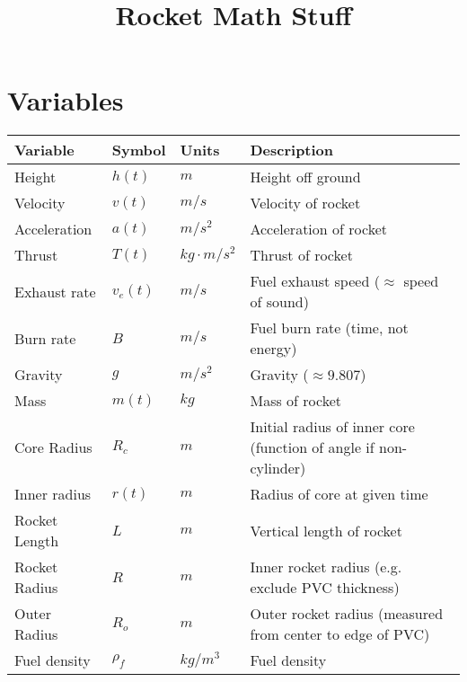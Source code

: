 \documentclass[12pt,a4paper]{article}
\title{Rocket Math Stuff}
\date{}
\begin{document}
\maketitle


\section{Variables}


\begin{tabular}{l | l | l | l}
    \textbf{Variable} & \textbf{Symbol} & \textbf{Units} & \textbf{Description} \\
    \hline
    Height             & $h(t)$      & $m$                   & Height off ground \\
    Velocity           & $v(t)$      & $m/s$                 & Velocity of rocket \\
    Acceleration       & $a(t)$      & $m/s^2$               & Acceleration of rocket \\
    Thrust             & $T(t)$      & $kg\cdot m/s^2$       & Thrust of rocket \\
    Exhaust rate       & $v_e(t)$    & $m/s$                 & Fuel exhaust speed ($\approx $ speed of sound) \\
    Burn rate          & $B$         & $m/s$                 & Fuel burn rate (time, not energy) \\
    Gravity            & $g$         & $m/s^2$               & Gravity ($\approx 9.807$) \\
    Mass               & $m(t)$      & $kg$                  & Mass of rocket \\
    Core Radius        & $R_c$       & $m$                   & Initial radius of inner core (function of angle if non-cylinder) \\
    Inner radius       & $r(t)$      & $m$                   & Radius of core at given time \\
    Rocket Length      & $L$         & $m$                   & Vertical length of rocket \\
    Rocket Radius      & $R$         & $m$                   & Inner rocket radius (e.g. exclude PVC thickness) \\
    Outer Radius       & $R_o$       & $m$                   & Outer rocket radius (measured from center to edge of PVC) \\
    Fuel density       & $\rho_f$    & $kg/m^3$              & Fuel density \\

\end{tabular}
\end{document}
